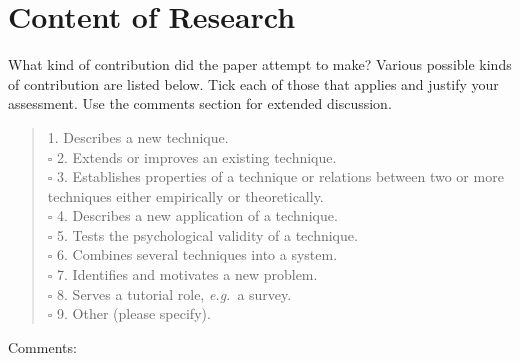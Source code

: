 \documentclass{article}
\begin{document}
\section{Content of Research}
{\small What kind of contribution did the paper attempt to make?
Various possible kinds of contribution are listed below.  Tick
each of those that applies and justify your assessment. Use the
comments section for extended discussion.}
\begin{verse}



\makebox[0pt][l]{$\square$}\raisebox{.15ex}{\hspace{0.1em}$\checkmark$}
1. Describes a new technique.  \\
$\square$
2. Extends or improves an existing technique.  \\
$\square$
3. Establishes properties of a technique or relations between two
or more techniques either empirically or theoretically.  \\
$\square$
4. Describes a new application of a technique.  \\
$\square$
5. Tests the psychological validity of a technique.  \\
$\square$
6. Combines several techniques into a system.  \\
$\square$
7. Identifies and motivates a new problem.  \\
$\square$
8. Serves a tutorial role, {\em e.g.}~a survey.  \\
$\square$
9. Other (please specify).  \\
\end{verse}
Comments: \\
\boxed{}
\end{document}
